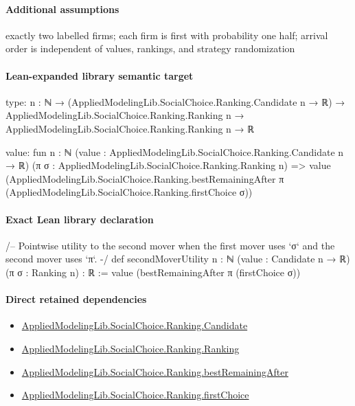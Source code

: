 \documentclass[10pt]{article}
\begin{document}
\paragraph{Additional assumptions}
\begin{sloppypar}
exactly two labelled firms; each firm is first with probability one half; arrival order is independent of values, rankings, and strategy randomization
\end{sloppypar}

\paragraph{Lean-expanded library semantic target}
\begin{ReviewVerbatim}
type:
{n : ℕ} →
  (AppliedModelingLib.SocialChoice.Ranking.Candidate n → ℝ) →
    AppliedModelingLib.SocialChoice.Ranking.Ranking n → AppliedModelingLib.SocialChoice.Ranking.Ranking n → ℝ

value:
fun {n : ℕ} (value : AppliedModelingLib.SocialChoice.Ranking.Candidate n → ℝ)
    (π σ : AppliedModelingLib.SocialChoice.Ranking.Ranking n) =>
  value
    (AppliedModelingLib.SocialChoice.Ranking.bestRemainingAfter π
      (AppliedModelingLib.SocialChoice.Ranking.firstChoice σ))
\end{ReviewVerbatim}

\paragraph{Exact Lean library declaration}
\begin{ReviewVerbatim}
/-- Pointwise utility to the second mover when the first mover uses `σ`
and the second mover uses `π`. -/
def secondMoverUtility {n : ℕ} (value : Candidate n → ℝ)
    (π σ : Ranking n) : ℝ :=
  value (bestRemainingAfter π (firstChoice σ))
\end{ReviewVerbatim}

\paragraph{Direct retained dependencies}
\begin{itemize}\raggedright
\item \hyperlink{library-prerequisite-8c0e6c25845ae78a}{Applied\allowbreak{}Modeling\allowbreak{}Lib.\allowbreak{}Social\allowbreak{}Choice.\allowbreak{}Ranking.\allowbreak{}Candidate}
\item \hyperlink{library-prerequisite-5cde54446d1ae021}{Applied\allowbreak{}Modeling\allowbreak{}Lib.\allowbreak{}Social\allowbreak{}Choice.\allowbreak{}Ranking.\allowbreak{}Ranking}
\item \hyperlink{governing-declaration-c45e0884fe6eea78}{Applied\allowbreak{}Modeling\allowbreak{}Lib.\allowbreak{}Social\allowbreak{}Choice.\allowbreak{}Ranking.\allowbreak{}best\allowbreak{}Remaining\allowbreak{}After}
\item \hyperlink{governing-declaration-08e457479ee6cf15}{Applied\allowbreak{}Modeling\allowbreak{}Lib.\allowbreak{}Social\allowbreak{}Choice.\allowbreak{}Ranking.\allowbreak{}first\allowbreak{}Choice}
\end{itemize}
\end{document}
